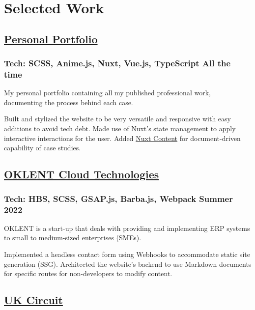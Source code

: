 \section*{Selected Work}
%
%
%
%
%
%
\subsection*{
  \href{https://bumbleboss.xyz/}{Personal Portfolio}
}
\subsubsection*{
  Tech: SCSS, Anime.js, Nuxt, Vue.js, TypeScript
  \hspace*{\fill}
  All the time
}
My personal portfolio containing all my published professional work, documenting the
process behind each case.
\vspace{2mm}
\begin{tasks}
  \task Built and stylized the website to be very versatile and responsive with easy
  additions to avoid tech debt.
  \task Made use of Nuxt's state management to apply interactive interactions for
  the user.
  \task Added \href{https://content.nuxtjs.org/}{Nuxt Content} for document-driven
  capability of case studies.
\end{tasks}
%
%
%
%
\subsection*{
  \href{https://oklent.com/}{OKLENT Cloud Technologies}
}
\subsubsection*{
  Tech: HBS, SCSS, GSAP.js, Barba.js, Webpack
  \hspace*{\fill}
  Summer 2022
}
OKLENT is a start-up that deals with providing and implementing ERP systems
to small to medium-sized enterprises (SMEs).
\vspace{2mm}
\begin{tasks}
  \task Implemented a headless contact form using Webhooks to accommodate static
  site generation (SSG).
  \task Architected the website’s backend to use Markdown documents for
  specific routes for non-developers to modify content.
\end{tasks}
%
%
%
%
\subsection*{
  \href{https://bumbleboss.xyz/w/uk-circuit}{UK Circuit}
}
